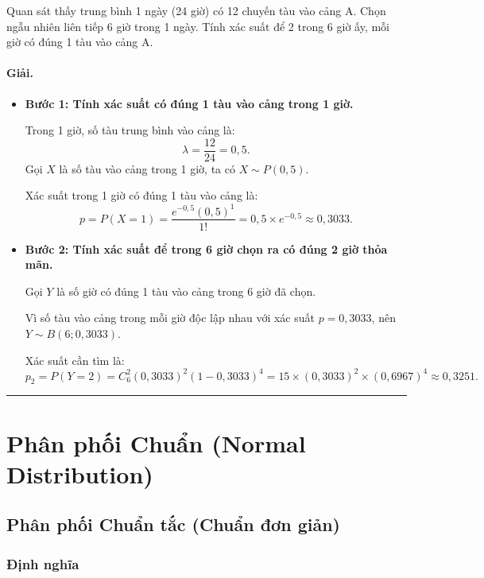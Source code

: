 \begin{vidu}[VD 3]
Quan sát thấy trung bình 1 ngày (24 giờ) có 12 chuyến tàu vào cảng A. Chọn ngẫu nhiên liên tiếp 6 giờ trong 1 ngày. Tính xác suất để 2 trong 6 giờ ấy, mỗi giờ có đúng 1 tàu vào cảng A.

\paragraph{Giải.}
\begin{itemize}
    \item \textbf{Bước 1: Tính xác suất có đúng 1 tàu vào cảng trong 1 giờ.}
    
    Trong 1 giờ, số tàu trung bình vào cảng là:
    \[
    \lambda = \frac{12}{24} = 0{,}5.
    \]
    Gọi $X$ là số tàu vào cảng trong 1 giờ, ta có $X \sim P(0{,}5)$.
    
    Xác suất trong 1 giờ có đúng 1 tàu vào cảng là:
    \[
    p = P(X = 1) = \frac{e^{-0{,}5} (0{,}5)^1}{1!} = 0{,}5 \times e^{-0{,}5} \approx 0{,}3033.
    \]

    \item \textbf{Bước 2: Tính xác suất để trong 6 giờ chọn ra có đúng 2 giờ thỏa mãn.}
    
    Gọi $Y$ là số giờ có đúng 1 tàu vào cảng trong 6 giờ đã chọn.
    
    Vì số tàu vào cảng trong mỗi giờ độc lập nhau với xác suất $p = 0{,}3033$, nên $Y \sim B(6; 0{,}3033)$.
    
    Xác suất cần tìm là:
    \[
    p_2 = P(Y = 2) = C_6^2 (0{,}3033)^2 (1 - 0{,}3033)^4 = 15 \times (0{,}3033)^2 \times (0{,}6967)^4 \approx 0{,}3251.
    \]
\end{itemize}
\end{vidu}

\vspace{1.5em}
\hrule
\vspace{1.5em}

\section{Phân phối Chuẩn (Normal Distribution)}

\subsection{Phân phối Chuẩn tắc (Chuẩn đơn giản)}

\subsubsection{Định nghĩa}

